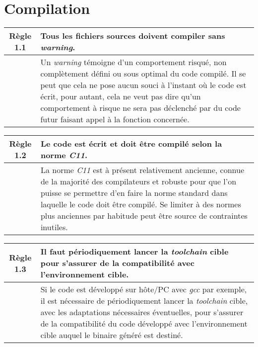 \section{Compilation}

\begin{center}
\begin{tabular}{|c p{12.3cm}|}
\hline
\rowcolor{red!10}\textbf{Règle 1.1} & Tous les fichiers sources doivent compiler sans \textit{warning}. \\ \hline
 & Un \textit{warning} témoigne d'un comportement risqué, non complètement défini ou sous optimal du code compilé. Il se peut que cela ne pose aucun souci à l'instant où le code est écrit, pour autant, cela ne veut pas dire qu'un comportement à risque ne sera pas déclenché par du code futur faisant appel à la fonction concernée.\\ \hline
\hline
\end{tabular}
\end{center}

\medskip

\begin{center}
\begin{tabular}{|c p{12.3cm}|}
\hline
\rowcolor{red!10}\textbf{Règle 1.2} & Le code est écrit et doit être compilé selon la norme \textit{C11}. \\ \hline
 & La norme \textit{C11} est à présent relativement ancienne, connue de la majorité des compilateurs et robuste pour que l'on puisse se permettre d'en faire la norme standard dans laquelle le code doit être compilé. Se limiter à des normes plus anciennes par habitude peut être source de contraintes inutiles.\\ \hline
\hline
\end{tabular}
\end{center}

\medskip

\begin{center}
\begin{tabular}{|c p{12.3cm}|}
\hline
\rowcolor{red!10}\textbf{Règle 1.3} & Il faut périodiquement lancer la \textit{toolchain} cible pour s'assurer de la compatibilité avec l'environnement cible. \\ \hline
 &  Si le code est développé sur hôte/PC avec \textit{gcc} par exemple, il est nécessaire de périodiquement lancer la \textit{toolchain} cible, avec les adaptations nécessaires éventuelles, pour s'assurer de la compatibilité du code développé avec l'environnement cible auquel le binaire généré est destiné. \\ \hline
\hline
\end{tabular}
\end{center}


